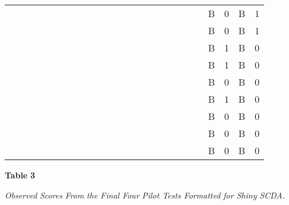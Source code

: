 \documentclass{article}
\begin{document}
\begin{table}
\begin{tabular}{c  c  c  c  c  c  c  c  c  c  c  c  c  c  c  c  c  c}
  &   &   &   &   &   &   &   &   &   &   &   &   &   & B & 0 & B & 1\\
  &   &   &   &   &   &   &   &   &   &   &   &   &   & B & 0 & B & 1\\
  &   &   &   &   &   &   &   &   &   &   &   &   &   & B & 1 & B & 0\\
  &   &   &   &   &   &   &   &   &   &   &   &   &   & B & 1 & B & 0\\
  &   &   &   &   &   &   &   &   &   &   &   &   &   & B & 0 & B & 0\\
  &   &   &   &   &   &   &   &   &   &   &   &   &   & B & 1 & B & 0\\
  &   &   &   &   &   &   &   &   &   &   &   &   &   & B & 0 & B & 0\\
  &   &   &   &   &   &   &   &   &   &   &   &   &   & B & 0 & B & 0\\
  &   &   &   &   &   &   &   &   &   &   &   &   &   & B & 0 & B & 0\\


\end{tabular}


\end{table}


\textbf{Table }\textbf{3}

\emph{Observed }\emph{Scores }\emph{From}\emph{ the Final Four}\emph{ Pilot Tests Formatted for Shiny SCDA.}
\end{document}
